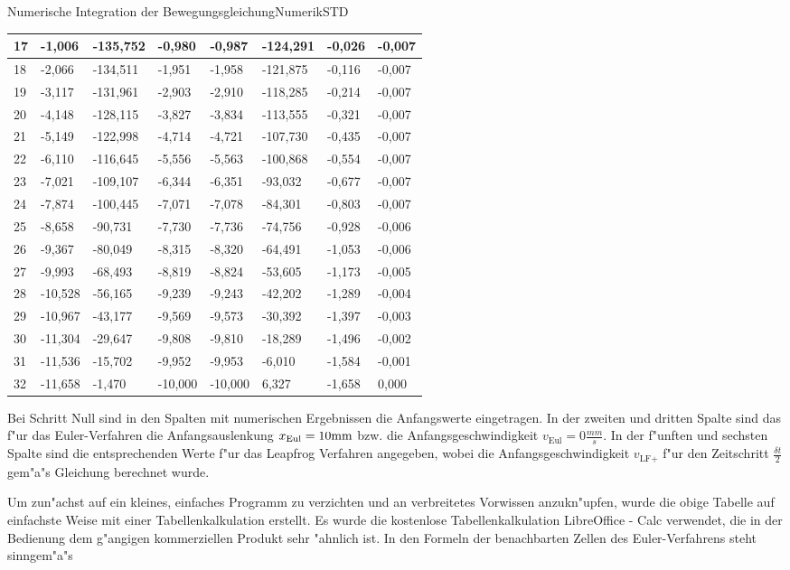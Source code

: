 \begin{MXContent}{Numerische Integration der Bewegungsgleichung}{Numerik}{STD}
\begin{tabular}{|l|l|l|l|l|l|l|l|}
17&-1,006&-135,752&-0,980&-0,987&-124,291&-0,026&-0,007\\\hline
18&-2,066&-134,511&-1,951&-1,958&-121,875&-0,116&-0,007\\\hline
19&-3,117&-131,961&-2,903&-2,910&-118,285&-0,214&-0,007\\\hline
20&-4,148&-128,115&-3,827&-3,834&-113,555&-0,321&-0,007\\\hline
21&-5,149&-122,998&-4,714&-4,721&-107,730&-0,435&-0,007\\\hline
22&-6,110&-116,645&-5,556&-5,563&-100,868&-0,554&-0,007\\\hline
23&-7,021&-109,107&-6,344&-6,351&-93,032&-0,677&-0,007\\\hline
24&-7,874&-100,445&-7,071&-7,078&-84,301&-0,803&-0,007\\\hline
25&-8,658&-90,731&-7,730&-7,736&-74,756&-0,928&-0,006\\\hline
26&-9,367&-80,049&-8,315&-8,320&-64,491&-1,053&-0,006\\\hline
27&-9,993&-68,493&-8,819&-8,824&-53,605&-1,173&-0,005\\\hline
28&-10,528&-56,165&-9,239&-9,243&-42,202&-1,289&-0,004\\\hline
29&-10,967&-43,177&-9,569&-9,573&-30,392&-1,397&-0,003\\\hline
30&-11,304&-29,647&-9,808&-9,810&-18,289&-1,496&-0,002\\\hline
31&-11,536&-15,702&-9,952&-9,953&-6,010&-1,584&-0,001\\\hline
32&-11,658&-1,470&-10,000&-10,000&6,327&-1,658&0,000\\\hline
\end{tabular}

Bei Schritt Null sind in den Spalten mit numerischen Ergebnissen die Anfangswerte eingetragen. In der zweiten und dritten Spalte sind das f"ur das Euler-Verfahren die Anfangsauslenkung $x_{\text{Eul}}=10\mathrm{mm}$ bzw. die Anfangsgeschwindigkeit $v_{\text{Eul}}=0\frac{mm}{s}$. In der f"unften und sechsten Spalte sind die entsprechenden Werte f"ur das Leapfrog Verfahren angegeben, wobei die Anfangsgeschwindigkeit $v_{\text{LF+}}$ f"ur den Zeitschritt $\frac{\delta t}{2}$ gem"a"s Gleichung  berechnet wurde.

Um zun"achst auf ein kleines, einfaches Programm zu verzichten und an verbreitetes Vorwissen anzukn"upfen, wurde die obige Tabelle auf einfachste Weise mit einer Tabellenkalkulation erstellt. Es wurde die kostenlose Tabellenkalkulation LibreOffice - Calc verwendet, die in der Bedienung dem g"angigen kommerziellen Produkt sehr "ahnlich ist. In den Formeln der benachbarten Zellen des Euler-Verfahrens steht sinngem"a"s


\end{MXContent}

